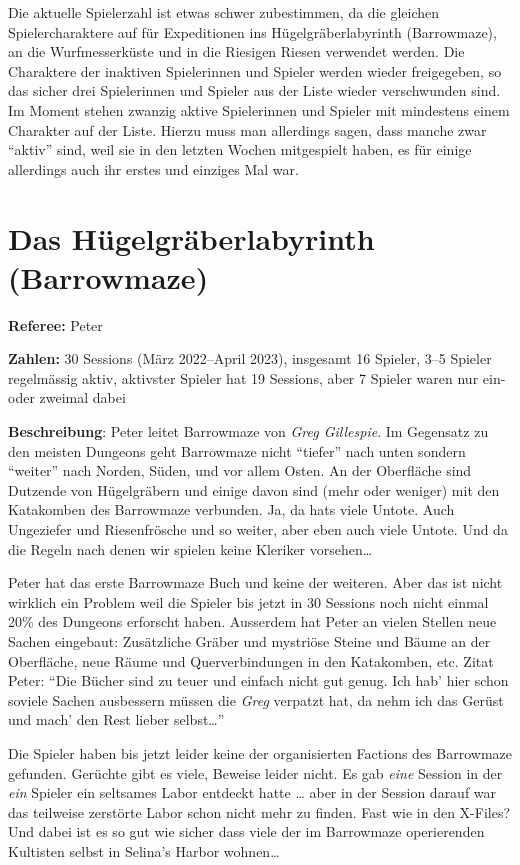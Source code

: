 \documentclass[11pt]{wbzine}
\begin{document}
\begin{multicols}{2}
    Die aktuelle Spielerzahl ist etwas schwer zubestimmen, da die
    gleichen Spielercharaktere auf für Expeditionen ins
    Hügelgräberlabyrinth (Barrowmaze), an die Wurfmesserküste und in
    die Riesigen Riesen verwendet werden. Die Charaktere der
    inaktiven Spielerinnen und Spieler werden wieder freigegeben, so
    das sicher drei Spielerinnen und Spieler aus der Liste wieder
    verschwunden sind. Im Moment stehen zwanzig aktive Spielerinnen
    und Spieler mit mindestens einem Charakter auf der Liste. Hierzu
    muss man allerdings sagen, dass manche zwar “aktiv” sind, weil sie in
    den letzten Wochen mitgespielt haben, es für einige allerdings
    auch ihr erstes und einziges Mal war.


\section{Das Hügelgräberlabyrinth (Barrowmaze)}

\textbf{Referee:} Peter

\textbf{Zahlen:} 30 Sessions (März 2022--April 2023),
insgesamt 16 Spieler,
3--5 Spieler regelmässig aktiv,
aktivster Spieler hat 19 Sessions,
aber 7 Spieler waren nur ein- oder zweimal dabei

\textbf{Beschreibung}: Peter leitet Barrowmaze von \textit{Greg Gillespie}.
Im Gegensatz zu den meisten Dungeons geht Barrowmaze nicht ``tiefer'' nach
unten sondern ``weiter'' nach Norden, Süden, und vor allem Osten. An der
Oberfläche sind Dutzende von Hügelgräbern und einige davon sind (mehr oder
weniger) mit den Katakomben des Barrowmaze verbunden. Ja, da hats viele
Untote. Auch Ungeziefer und Riesenfrösche und so weiter, aber eben auch
viele Untote. Und da die Regeln nach denen wir spielen keine Kleriker
vorsehen\dots{}

Peter hat das erste Barrowmaze Buch und keine der weiteren. Aber das ist
nicht wirklich ein Problem weil die Spieler bis jetzt in 30 Sessions noch
nicht einmal 20\% des Dungeons erforscht haben. Ausserdem hat Peter an
vielen Stellen neue Sachen eingebaut: Zusätzliche Gräber und mystriöse
Steine und Bäume an der Oberfläche, neue Räume und Querverbindungen in
den Katakomben, etc. Zitat Peter: ``Die Bücher sind zu teuer und einfach
nicht gut genug. Ich hab' hier schon soviele Sachen ausbessern müssen die
\textit{Greg} verpatzt hat, da nehm ich das Gerüst und mach' den Rest
lieber selbst\dots{}''

Die Spieler haben bis jetzt leider keine der organisierten Factions des
Barrowmaze gefunden. Gerüchte gibt es viele, Beweise leider nicht. Es gab
\emph{eine} Session in der \emph{ein} Spieler ein seltsames Labor entdeckt
hatte \dots{} aber in der Session darauf war das teilweise zerstörte Labor
schon nicht mehr zu finden. Fast wie in den X-Files? Und dabei ist es so
gut wie sicher dass viele der im Barrowmaze operierenden Kultisten selbst
in Selina's Harbor wohnen\dots{}


\end{multicols}
\end{document}

